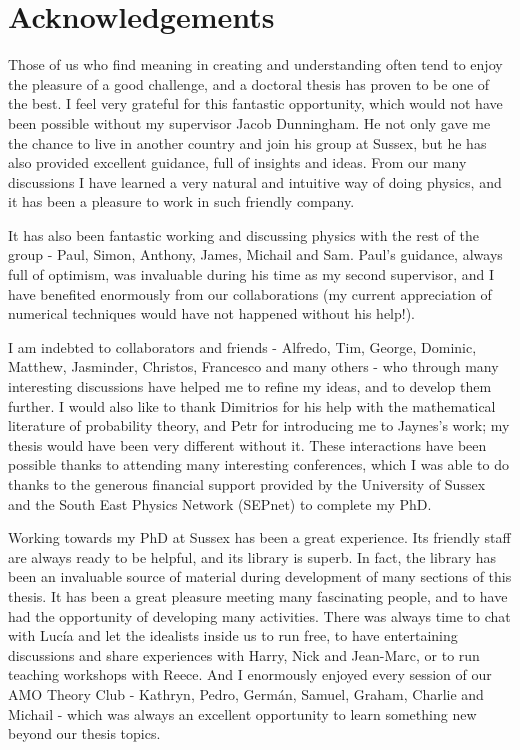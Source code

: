 \documentclass[a4paper,12pt,oneside]{report}
\newcommand{\linespacing}{1}
\renewcommand{\baselinestretch}{\linespacing}
\newcommand\blankpage{
    \null
    \thispagestyle{empty}
    \newpage}
\begin{document}
\clearpage


\chapter*{Acknowledgements}
\renewcommand{\baselinestretch}{\linespacing}
\small\normalsize

Those of us who find meaning in creating and understanding often tend to enjoy the pleasure of a good challenge, and a doctoral thesis has proven to be one of the best. I feel very grateful for this fantastic opportunity, which would not have been possible without my supervisor Jacob Dunningham. He not only gave me the chance to live in another country and join his group at Sussex, but he has also provided excellent guidance, full of insights and ideas. From our many discussions I have learned a very natural and intuitive way of doing physics, and it has been a pleasure to work in such friendly company. 

It has also been fantastic working and discussing physics with the rest of the group - Paul, Simon, Anthony, James, Michail and Sam. Paul's guidance, always full of optimism, was invaluable during his time as my second supervisor, and I have benefited enormously from our collaborations (my current appreciation of numerical techniques would have not happened without his help!).

I am indebted to collaborators and friends - Alfredo, Tim, George, Dominic, Matthew, Jasminder, Christos, Francesco and many others - who through many interesting discussions have helped me to refine my ideas, and to develop them further. I would also like to thank Dimitrios for his help with the mathematical literature of probability theory, and Petr for introducing me to Jaynes's work; my thesis would have been very different without it. These interactions have been possible thanks to attending many interesting conferences, which I was able to do thanks to the generous financial support provided by the University of Sussex and the South East Physics Network (SEPnet) to complete my PhD.

Working towards my PhD at Sussex has been a great experience. Its friendly staff are always ready to be helpful, and its library is superb. In fact, the library has been an invaluable source of material during development of many sections of this thesis. It has been a great pleasure meeting many fascinating people, and to have had the opportunity of developing many activities. There was always time to chat with Luc\'{i}a and let the idealists inside us to run free, to have entertaining discussions and share experiences with Harry, Nick and Jean-Marc, or to run teaching workshops with Reece. And I enormously enjoyed every session of our AMO Theory Club - Kathryn, Pedro, Germ\'{a}n, Samuel, Graham, Charlie and Michail - which was always an excellent opportunity to learn something new beyond our thesis topics. 
\end{document}

